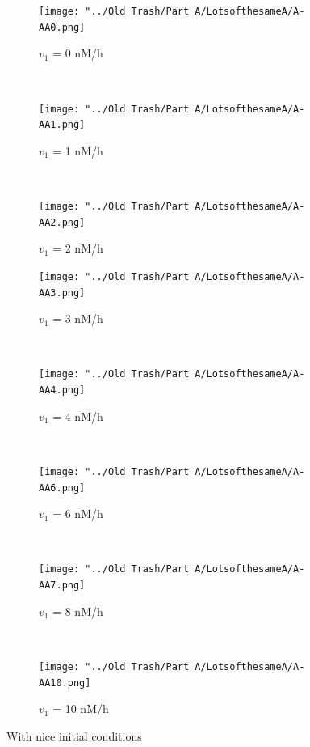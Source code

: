 \documentclass[10pt,a4paper,oneside,twocolumn]{article}
\numberwithin{equation}{section} %
\begin{document}
    \begin{figure}
    \centering
	\begin{subfigure}[b]{0.32\textwidth}
	    \texttt{[image: "../Old Trash/Part A/LotsofthesameA/A-AA0.png]}
	    \caption{$v_1$ = 0 nM/h}
	\end{subfigure}
	~ 
	\begin{subfigure}[b]{0.32\textwidth}
	    \texttt{[image: "../Old Trash/Part A/LotsofthesameA/A-AA1.png]}
	    \caption{$v_1$ = 1 nM/h}
	\end{subfigure}
	~ 
	\begin{subfigure}[b]{0.32\textwidth}
	    \texttt{[image: "../Old Trash/Part A/LotsofthesameA/A-AA2.png]}
	    \caption{$v_1$ = 2 nM/h}
	\end{subfigure}
	 
	\begin{subfigure}[b]{0.32\textwidth}
	    \texttt{[image: "../Old Trash/Part A/LotsofthesameA/A-AA3.png]}
	    \caption{$v_1$ = 3 nM/h}
	\end{subfigure}
	~ 
	\begin{subfigure}[b]{0.32\textwidth}
	    \texttt{[image: "../Old Trash/Part A/LotsofthesameA/A-AA4.png]}
	    \caption{$v_1$ = 4 nM/h}
	\end{subfigure}
	~
	\begin{subfigure}[b]{0.32\textwidth}
	    \texttt{[image: "../Old Trash/Part A/LotsofthesameA/A-AA6.png]}
	    \caption{$v_1$ = 6 nM/h}
	\end{subfigure}
	~ 
	\begin{subfigure}[b]{0.32\textwidth}
	    \texttt{[image: "../Old Trash/Part A/LotsofthesameA/A-AA7.png]}
	    \caption{$v_1$ = 8 nM/h}
	\end{subfigure}
	~
	\begin{subfigure}[b]{0.32\textwidth}
	    \texttt{[image: "../Old Trash/Part A/LotsofthesameA/A-AA10.png]}
	    \caption{$v_1$ = 10 nM/h}
	\end{subfigure}
	
	\caption{With nice initial conditions}
    \end{figure}
\end{document}
